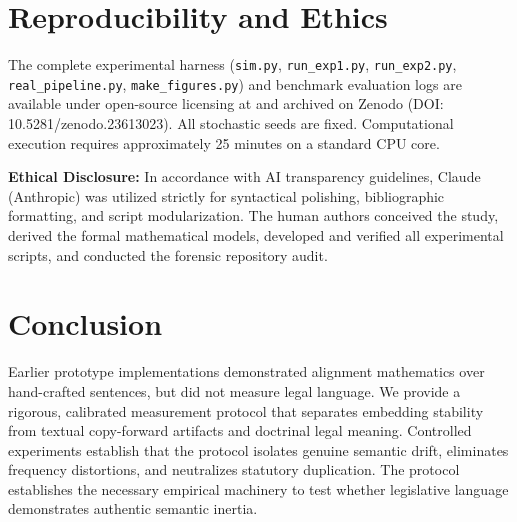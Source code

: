\documentclass[conference]{IEEEtran}
\begin{document}
\section{Reproducibility and Ethics}
{\sloppy The complete experimental harness (\texttt{sim.py}, \texttt{run\_exp1.py}, \texttt{run\_exp2.py}, \texttt{real\_pipeline.py}, \texttt{make\_figures.py}) and benchmark evaluation logs are available under open-source licensing at  and archived on Zenodo (DOI: 10.5281/zenodo.23613023). All stochastic seeds are fixed. Computational execution requires approximately 25 minutes on a standard CPU core.\par}

\textbf{Ethical Disclosure:} In accordance with AI transparency guidelines, Claude (Anthropic) was utilized strictly for syntactical polishing, bibliographic formatting, and script modularization. The human authors conceived the study, derived the formal mathematical models, developed and verified all experimental scripts, and conducted the forensic repository audit.

\section{Conclusion}
Earlier prototype implementations demonstrated alignment mathematics over hand-crafted sentences, but did not measure legal language. We provide a rigorous, calibrated measurement protocol that separates embedding stability from textual copy-forward artifacts and doctrinal legal meaning. Controlled experiments establish that the protocol isolates genuine semantic drift, eliminates frequency distortions, and neutralizes statutory duplication. The protocol establishes the necessary empirical machinery to test whether legislative language demonstrates authentic semantic inertia.
\end{document}
